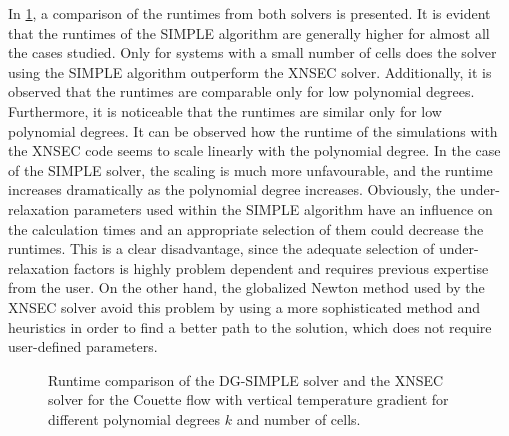 In \cref{fig:RuntimeComparison}, a comparison of the runtimes from both solvers is presented. It is evident that the runtimes of the SIMPLE algorithm are generally higher for almost all the cases studied. Only for systems with a small number of cells does the solver using the SIMPLE algorithm outperform the XNSEC solver. Additionally, it is observed that the runtimes are comparable only for low polynomial degrees. Furthermore, it is noticeable that the runtimes are similar only for low polynomial degrees. It can be observed  how the runtime of the simulations with the XNSEC code seems to scale linearly with the polynomial degree. In the case of the SIMPLE solver, the scaling is much more unfavourable, and the runtime increases dramatically as the polynomial degree increases. Obviously, the under-relaxation parameters used within the SIMPLE algorithm have an influence on the calculation times and an appropriate selection of them could decrease the runtimes. This is a clear disadvantage, since the adequate selection of under-relaxation factors is highly problem dependent and requires previous expertise from the user. On the other hand, the globalized Newton method used by the XNSEC solver avoid this problem by using a more sophisticated method and heuristics in order to find a better path to the solution, which does not require user-defined parameters.
\begin{figure}	
\centering
	\caption{Runtime comparison of the DG-SIMPLE solver and the XNSEC solver for the Couette flow with vertical temperature gradient for different polynomial degrees $k$ and number of cells.}
	\label{fig:RuntimeComparison}
\end{figure}